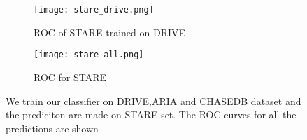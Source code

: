 \begin{figure}
	\centering
	\begin{subfigure}[b]{0.45\textwidth}
		\texttt{[image: stare\_drive.png]}
		\caption{ROC of STARE trained  on DRIVE}
		\label{fig:str}
	\end{subfigure}
	\begin{subfigure}[b]{0.45\textwidth}
		\texttt{[image: stare\_all.png]}
		\caption{ROC for STARE}
		\label{fig:str1}
	\end{subfigure}

	\caption[Cross training comparison for STARE dataset]{We train our classifier on DRIVE,ARIA and CHASEDB dataset and the prediciton are made on STARE set. The ROC curves for all the predictions are shown}
	\label{fig:comparestare}
\end{figure}